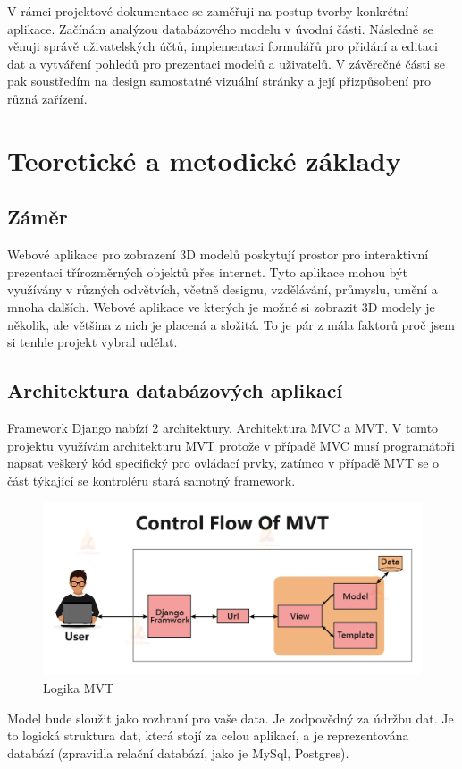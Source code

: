 \documentclass[12pt, a4paper,
twoside,        %
openright
]{report}
\begin{document}
V rámci projektové dokumentace se zaměřuji na postup tvorby konkrétní aplikace. Začínám analýzou databázového modelu v úvodní části. Následně se věnuji správě uživatelských účtů, implementaci formulářů pro přidání a editaci dat a vytváření pohledů pro prezentaci modelů a uživatelů. V závěrečné části se pak soustředím na design samostatné vizuální stránky a její přizpůsobení pro různá zařízení.


\let\cleardoublepage\clearpage

\chapter{Teoretické a metodické základy}

\section{Záměr}
\label{sec:uvod}

Webové aplikace pro zobrazení 3D modelů poskytují prostor pro interaktivní prezentaci třírozměrných objektů přes internet. Tyto aplikace mohou být využívány v různých odvětvích, včetně designu, vzdělávání, průmyslu, umění a mnoha dalších. Webové aplikace ve kterých je možné si zobrazit 3D modely je několik, ale většina z nich je placená a složitá. To je pár z mála faktorů proč jsem si tenhle projekt vybral udělat.

\section{Architektura databázových aplikací}
\label{sec:architektura}
Framework Django nabízí 2 architektury. Architektura MVC a MVT. V tomto projektu využívám architekturu MVT protože v případě MVC musí programátoři napsat veškerý kód specifický pro ovládací prvky, zatímco v případě MVT se o část týkající se kontroléru stará samotný framework. 
\begin{figure}[h]
			\centering
			\includegraphics[width=1\linewidth]{image/mvt.png} 
			\caption{Logika MVT}
			\label{fig:mvc}
\end{figure}
\newpage
Model bude sloužit jako rozhraní pro vaše data. Je zodpovědný za údržbu dat. Je to logická struktura dat, která stojí za celou aplikací, a je reprezentována databází (zpravidla relační databází, jako je MySql, Postgres).
\end{document}
